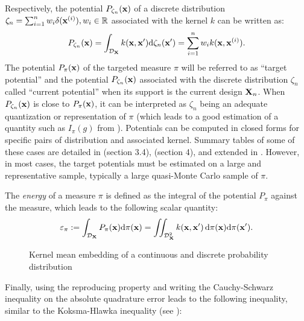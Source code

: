 Respectively, the potential $P_{\zeta_n}({\bf x})$ of a discrete distribution $\zeta_n = \sum_{i=1}^{n} w_i \delta({\bf x}^{(i)}), w_i \in \mathbb{R}$ associated with the kernel $k$ can be written as:
\begin{equation}\label{eq:potential}
    P_{\zeta_n}({\bf x}) =  \int_{\mathcal{D}_{{\bf X}}} k({\bf x}, {\bf x}') \mathrm{d} \zeta_n({\bf x}') = \sum_{i=1}^{n} w_i k({\bf x}, {\bf x}^{(i)}).
\end{equation}
The potential $P_{\pi}({\bf x})$ of the targeted measure $\pi$ will be referred to as ``target potential'' and the potential $P_{\zeta_n}({\bf x})$ associated with the discrete distribution $\zeta_n$ called ``current potential'' when its support is the current design ${\bf X}_n$. 
When $P_{\zeta_n}({\bf x})$ is close to $P_{\pi}({\bf x})$, it can be interpreted as $\zeta_n$ being an adequate quantization or representation of $\pi$ (which leads to a good estimation of a quantity such as $I_{\pi}(g)$ from ). 
Potentials can be computed in closed forms for specific pairs of distribution and associated kernel. Summary tables of some of these cases are detailed in \cite{briol_phd_2019} (section 3.4), \cite{pronzato_zhigljavsky_2020} (section 4), and extended in \cite{fekhari_iooss_2023}. 
However, in most cases, the target potentials must be estimated on a large and representative sample, typically a large quasi-Monte Carlo sample of $\pi$.

\medskip
\begin{definition}
The \emph{energy} of a measure $\pi$ is defined as the integral of the potential $P_\pi$ against the measure, which leads to the following scalar quantity:
\begin{equation}
    \varepsilon_\pi:= \int_{\mathcal{D}_{{\bf X}}} P_{\pi}({\bf x}) \mathrm{d} \pi({\bf x}) = \iint_{\mathcal{D}_{{\bf X}}^2} k({\bf x}, {\bf x}')\, \mathrm{d}\pi({\bf x}) \mathrm{d}\pi({\bf x}').
\end{equation}
\label{eq:target_energy}
\end{definition}

\begin{figure}
    \centering
    
    \caption{Kernel mean embedding of a continuous and discrete probability distribution}
    \label{fig:kernel_mean_embedding}
\end{figure}
Finally, using the reproducing property and writing the Cauchy-Schwarz inequality on the absolute quadrature error leads to the following inequality, similar to the Koksma-Hlawka inequality  (see \cite{briol_oates_2019}): 

